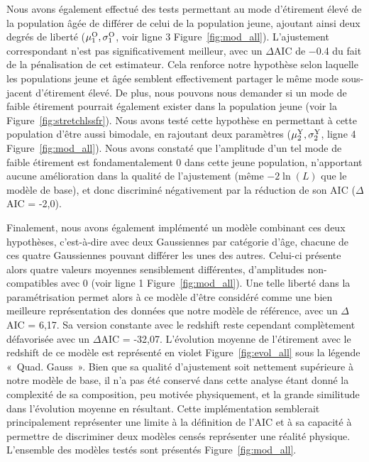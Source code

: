 \documentclass[../main/main.tex]{subfiles}
\begin{document}
Nous avons également effectué des tests permettant au mode d'étirement élevé de
la population âgée de différer de celui de la population jeune, ajoutant ainsi
deux degrés de liberté ($\mu_1^{\rm O}, \sigma_1^{\rm O}$, voir ligne 3
Figure~\ref{fig:mod_all}). L'ajustement correspondant n'est pas
significativement meilleur, avec un $\Delta$AIC de \num{-0.4} du fait de la
pénalisation de cet estimateur. Cela renforce notre hypothèse selon laquelle les
populations jeune et âgée semblent effectivement partager le même mode
sous-jacent d'étirement élevé. De plus, nous pouvons nous demander si un mode de
faible étirement pourrait également exister dans la population jeune (voir la
Figure~\ref{fig:stretchlssfr}). Nous avons testé cette hypothèse en permettant à
cette population d'être aussi bimodale, en rajoutant deux
paramètres ($\mu_2^{\rm Y}, \sigma_2^{\rm Y}$, ligne 4
Figure~\ref{fig:mod_all}). Nous avons constaté que l'amplitude d'un tel mode de
faible étirement est fondamentalement 0 dans cette jeune population, n'apportant
aucune amélioration dans la qualité de l'ajustement (même $-2\ln(L)$ que le
modèle de base), et donc discriminé négativement par la réduction de son AIC
($\Delta$AIC = -2,0).

Finalement, nous avons également implémenté un modèle combinant ces deux
hypothèses, c'est-à-dire avec deux Gaussiennes par catégorie d'âge, chacune de
ces quatre Gaussiennes pouvant différer les unes des autres. Celui-ci présente
alors quatre valeurs moyennes sensiblement différentes, d'amplitudes
non-compatibles avec 0 (voir ligne 1 Figure~\ref{fig:mod_all}). Une telle
liberté dans la paramétrisation permet alors à ce modèle d'être considéré comme
une bien meilleure représentation des données que notre modèle de référence,
avec un $\Delta$AIC = 6,17. Sa version constante avec le redshift reste
cependant complètement défavorisée avec un $\Delta$AIC = -32,07. L'évolution
moyenne de l'étirement avec le redshift de ce modèle est représenté en violet
Figure~\ref{fig:evol_all} sous la légende «~Quad. Gauss~». Bien que sa qualité
d'ajustement soit nettement supérieure à notre modèle de base, il n'a pas été
conservé dans cette analyse étant donné la complexité de sa composition, peu
motivée physiquement, et la grande similitude dans l'évolution moyenne en
résultant. Cette implémentation semblerait principalement représenter une limite
à la définition de l'AIC et à sa capacité à permettre de discriminer deux
modèles censés représenter une réalité physique. L'ensemble des modèles testés
sont présentés Figure~\ref{fig:mod_all}.
\end{document}
